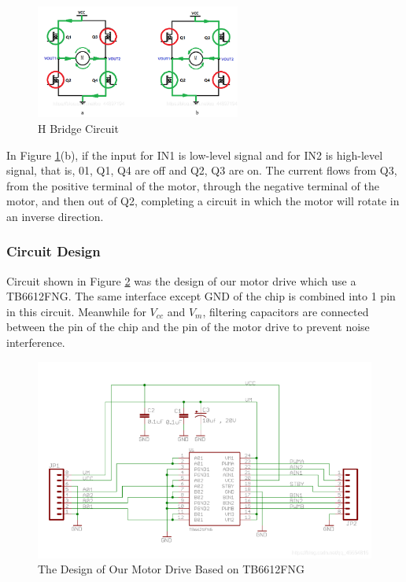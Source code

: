 \documentclass[12pt, a4paper, oneside]{report}
\begin{document}
\begin{figure}[H]
  \centering
  \includegraphics[width=0.6\textwidth]{pic/Motor Drive/3.png}
  \caption{H Bridge Circuit}
  \label{fig:mt3}
\end{figure}

In Figure \ref{fig:mt3}(b), if the input for IN1 is low-level signal and for IN2 is high-level signal, that is, 01, Q1, Q4 are off and Q2, Q3 are on. The current flows from Q3, from the positive terminal of the motor, through the negative terminal of the motor, and then out of Q2, completing a circuit in which the motor will rotate in an inverse direction.

\subsubsection{Circuit Design}
Circuit shown in Figure \ref{fig:mt4} was the design of our motor drive which use a TB6612FNG. The same interface except GND of the chip is combined into 1 pin in this circuit. Meanwhile for $V_{cc}$ and $V_m$, filtering capacitors are connected between the pin of the chip and the pin of the motor drive to prevent noise interference. 

\begin{figure}[H]
  \centering
  \includegraphics[width=1\textwidth]{pic/Motor Drive/4.png}
  \caption{The Design of Our Motor Drive Based on TB6612FNG}
  \label{fig:mt4}
\end{figure}
\end{document}
